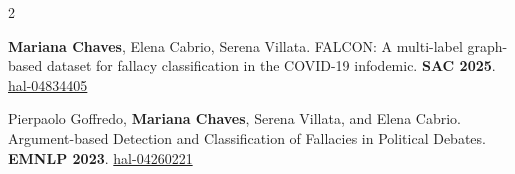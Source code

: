 \documentclass[10pt,a4paper,ragged2e,withhyper]{altacv}
\begin{document}
\begin{paracol}{2}





\begin{justify}
  \vspace{-1em}
  \textbf{Mariana Chaves}, Elena Cabrio, Serena Villata. FALCON: A multi-label graph-based dataset for fallacy classification in the COVID-19 infodemic. \textbf{SAC 2025}. \href{https://hal.science/hal-04834405v1}{hal-04834405}
\end{justify}

\vspace{1mm}

\begin{justify}
  \vspace{-1em}
  Pierpaolo Goffredo, \textbf{Mariana Chaves}, Serena Villata, and Elena Cabrio. Argument-based Detection and Classification of Fallacies in Political Debates. \textbf{EMNLP 2023}. \href{https://inria.hal.science/hal-04260221}{hal-04260221}
\end{justify}







\end{paracol}
\end{document}
